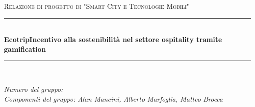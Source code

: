 \begin{titlepage}

\newcommand{\HRule}{\rule{\linewidth}{0.5mm}}

\center

\textsc{\Large Relazione di progetto di "Smart City e Tecnologie Mobili"}\\[0.5cm]

\HRule \\[0.4cm]
{ \huge \bfseries Ecotrip\break\break\large Incentivo alla sostenibilità nel settore ospitality tramite gamification}\\[0.4cm]
\HRule \\[1.5cm]

\vfill

\begin{flushleft}
\emph{Numero del gruppo:}\\[1cm]
\emph{Componenti del gruppo: Alan Mancini, Alberto Marfoglia, Matteo Brocca}\\[3cm]
\end{flushleft}



\end{titlepage}


\tableofcontents

\newpage

 









%
%

